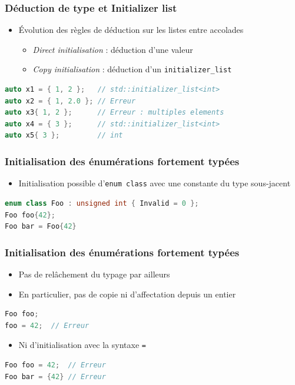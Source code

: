 \documentclass[C++.tex]{subfiles}
\begin{document}
\begin{frame}[fragile]
	\frametitle{Déduction de type et Initializer list}
	\begin{itemize}
		\item Évolution des règles de déduction sur les listes entre accolades
		\begin{itemize}
			\item \textit{Direct initialisation} : déduction d'une valeur
			
			
			\item \textit{Copy initialisation} : déduction d'un \lstinline|initializer_list|
			
		\end{itemize}
	\end{itemize}

	\begin{lstlisting}[language=C++]
auto x1 = { 1, 2 };   // std::initializer_list<int>
auto x2 = { 1, 2.0 }; // Erreur
auto x3{ 1, 2 };      // Erreur : multiples elements
auto x4 = { 3 };      // std::initializer_list<int>
auto x5{ 3 };         // int\end{lstlisting}
\end{frame}

\begin{frame}[fragile]
	\frametitle{Initialisation des énumérations fortement typées}
	\begin{itemize}
		\item Initialisation possible d'\lstinline|enum class| avec une constante du type sous-jacent
	\end{itemize}

	\begin{lstlisting}[language=C++]
enum class Foo : unsigned int { Invalid = 0 };
Foo foo{42};
Foo bar = Foo{42}\end{lstlisting}
\end{frame}

\begin{frame}[fragile]
	\frametitle{Initialisation des énumérations fortement typées}
	\begin{itemize}
		\item Pas de relâchement du typage par ailleurs
		\item En particulier, pas de copie ni d'affectation depuis un entier
	\end{itemize}

	\begin{lstlisting}[language=C++]
Foo foo;
foo = 42;  // Erreur\end{lstlisting}

	\begin{itemize}
		\item Ni d'initialisation avec la syntaxe \lstinline|=|
	\end{itemize}

	\begin{lstlisting}[language=C++]
Foo foo = 42;  // Erreur
Foo bar = {42} // Erreur\end{lstlisting}
\end{frame}
\end{document}
